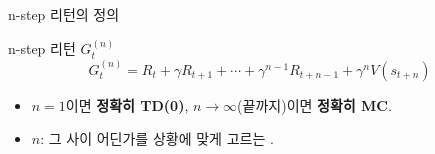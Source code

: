 \begin{frame}{n-step 리턴의 정의}
  \begin{block}{n-step 리턴 $G_t^{(n)}$}
    \[
    G_t^{(n)} = R_t + \gamma R_{t+1} + \cdots + \gamma^{n-1} R_{t+n-1}
    + \gamma^n V(s_{t+n})
    \]
  \end{block}
  \begin{itemize}
    \item $n=1$이면 \textbf{정확히 TD(0)}, $n\to\infty$(끝까지)이면
      \textbf{정확히 MC}.
    
    \item $n$: 그 사이 어딘가를 상황에 맞게 고르는 .
  \end{itemize}

\end{frame}
